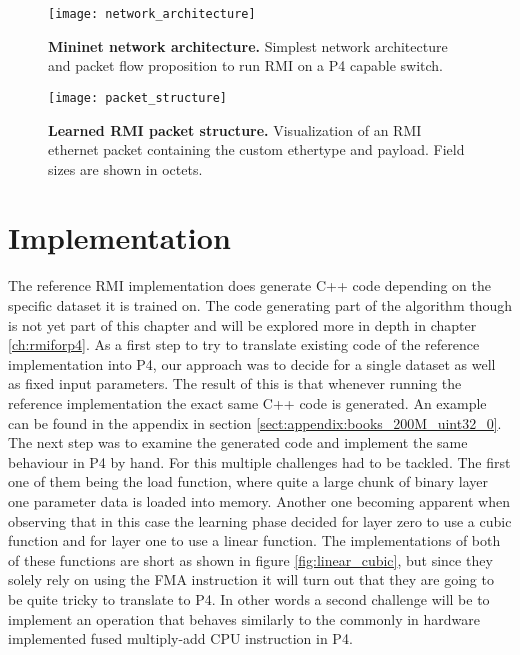 \begin{figure}[!ht]
  \centering
  \texttt{[image: network\_architecture]}
  \caption[Mininet Network Architecture]{
    \textbf{Mininet network architecture.} Simplest network architecture and packet flow proposition to run RMI on a P4 capable switch.
  }
  \label{fig:network_architecture}
\end{figure}

\begin{figure}[!ht]
  \centering
  \texttt{[image: packet\_structure]}
  \caption[RMI Packet Structure]{
    \textbf{Learned RMI packet structure.} Visualization of an RMI ethernet packet containing the custom ethertype and payload. Field sizes are shown in octets.
  }
  \label{fig:packet_structure}
\end{figure}

\section{Implementation}
\label{sect:rmionbmv2:implmentation}
The reference RMI implementation \cite{cdfshop} does generate C++ code depending on the specific dataset it is trained on. The code generating part of the algorithm though is not yet part of this chapter and will be explored more in depth in chapter \ref{ch:rmiforp4}. As a first step to try to translate existing code of the reference implementation into P4, our approach was to decide for a single dataset as well as fixed input parameters. The result of this is that whenever running the reference implementation the exact same C++ code is generated. An example can be found in the appendix in section \ref{sect:appendix:books_200M_uint32_0}. The next step was to examine the generated code and implement the same behaviour in P4 by hand. For this multiple challenges had to be tackled. The first one of them being the load function, where quite a large chunk of binary layer one parameter data is loaded into memory. Another one becoming apparent when observing that in this case the learning phase decided for layer zero to use a cubic function and for layer one to use a linear function. The implementations of both of these functions are short as shown in figure \ref{fig:linear_cubic}, but since they solely rely on using the FMA instruction it will turn out that they are going to be quite tricky to translate to P4. In other words a second challenge will be to implement an operation that behaves similarly to the commonly in hardware implemented fused multiply-add CPU instruction in P4.

